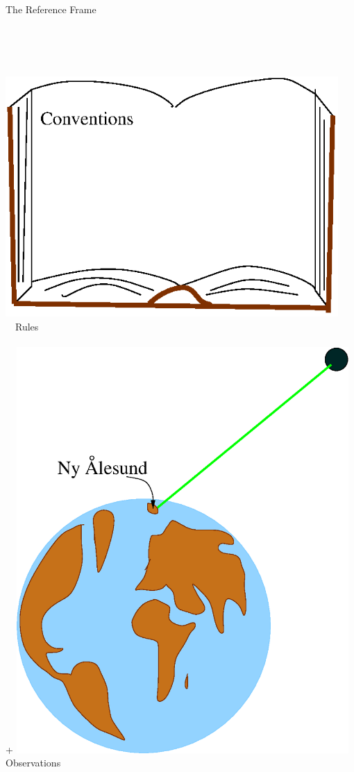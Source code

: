 \documentclass[12pt]{beamer}
\begin{document}
\begin{frame}{The Reference Frame}
  \begin{columns}
    \\ \ \\ \ \\
        \includegraphics[width=0.95\textwidth]{figure/book.eps}\\ \ \ Rules
    \\ \ \\ 
      +  
        \includegraphics[width=0.95\textwidth]{figure/jordklode.eps}\\ Observations

\end{columns}
\end{frame}
\end{document}
